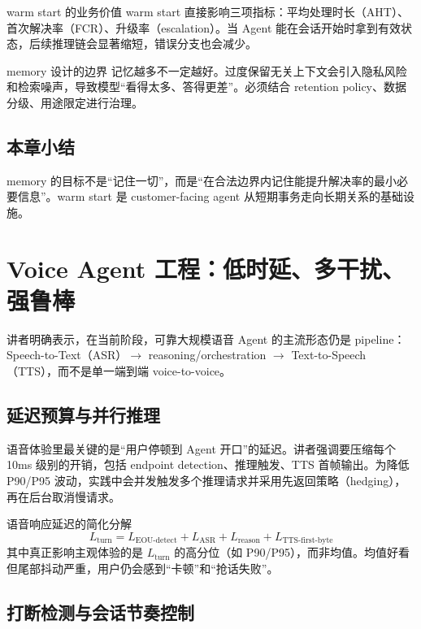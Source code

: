 \documentclass[a4paper]{article}
\begin{document}
\begin{importantbox}{warm start 的业务价值}
warm start 直接影响三项指标：平均处理时长（AHT）、首次解决率（FCR）、升级率（escalation）。当 Agent 能在会话开始时拿到有效状态，后续推理链会显著缩短，错误分支也会减少。
\end{importantbox}

\begin{warningbox}{memory 设计的边界}
记忆越多不一定越好。过度保留无关上下文会引入隐私风险和检索噪声，导致模型“看得太多、答得更差”。必须结合 retention policy、数据分级、用途限定进行治理。
\end{warningbox}

\subsection{本章小结}

memory 的目标不是“记住一切”，而是“在合法边界内记住能提升解决率的最小必要信息”。warm start 是 customer-facing agent 从短期事务走向长期关系的基础设施。

\section{Voice Agent 工程：低时延、多干扰、强鲁棒}

讲者明确表示，在当前阶段，可靠大规模语音 Agent 的主流形态仍是 pipeline：Speech-to-Text（ASR）$\rightarrow$ reasoning/orchestration $\rightarrow$ Text-to-Speech（TTS），而不是单一端到端 voice-to-voice。

\subsection{延迟预算与并行推理}

语音体验里最关键的是“用户停顿到 Agent 开口”的延迟。讲者强调要压缩每个 10ms 级别的开销，包括 endpoint detection、推理触发、TTS 首帧输出。为降低 P90/P95 波动，实践中会并发触发多个推理请求并采用先返回策略（hedging），再在后台取消慢请求。

\begin{knowledgebox}{语音响应延迟的简化分解}
\[
L_{\text{turn}} = L_{\text{EOU-detect}} + L_{\text{ASR}} + L_{\text{reason}} + L_{\text{TTS-first-byte}}
\]
其中真正影响主观体验的是 $L_{\text{turn}}$ 的高分位（如 P90/P95），而非均值。均值好看但尾部抖动严重，用户仍会感到“卡顿”和“抢话失败”。
\end{knowledgebox}

\subsection{打断检测与会话节奏控制}
\end{document}
